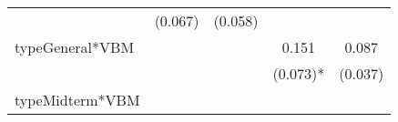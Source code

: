 \documentclass[12pt,twoside]{reedthesis}
\begin{document}
\begin{longtable}[]{@{}lcccc@{}}
\begin{minipage}[t]{0.14\columnwidth}
  \strut
  \end{minipage} & \begin{minipage}[t]{0.14\columnwidth}\centering\strut
  (0.067)\strut
  \end{minipage} & \begin{minipage}[t]{0.11\columnwidth}\centering\strut
  (0.058)\strut
  \end{minipage}\tabularnewline
  \begin{minipage}[t]{0.26\columnwidth}\raggedright\strut
  typeGeneral*VBM\strut
  \end{minipage} & \begin{minipage}[t]{0.12\columnwidth}\centering\strut
  \strut
  \end{minipage} & \begin{minipage}[t]{0.14\columnwidth}\centering\strut
  \strut
  \end{minipage} & \begin{minipage}[t]{0.14\columnwidth}\centering\strut
  0.151\strut
  \end{minipage} & \begin{minipage}[t]{0.11\columnwidth}\centering\strut
  0.087\strut
  \end{minipage}\tabularnewline
  \begin{minipage}[t]{0.26\columnwidth}\raggedright\strut
  \strut
  \end{minipage} & \begin{minipage}[t]{0.12\columnwidth}\centering\strut
  \strut
  \end{minipage} & \begin{minipage}[t]{0.14\columnwidth}\centering\strut
  \strut
  \end{minipage} & \begin{minipage}[t]{0.14\columnwidth}\centering\strut
  (0.073)*\strut
  \end{minipage} & \begin{minipage}[t]{0.11\columnwidth}\centering\strut
  (0.037)\strut
  \end{minipage}\tabularnewline
  \begin{minipage}[t]{0.26\columnwidth}\raggedright\strut
  typeMidterm*VBM\strut
  \end{minipage} & \begin{minipage}[t]{0.12\columnwidth}\centering\strut
  \strut
  \end{minipage} & \begin{minipage}[t]{0.14\columnwidth}\centering\strut
  \strut
  \end{minipage} & \begin{minipage}[t]{0.14\columnwidth}\centering\strut

\end{minipage}
\end{longtable}
\end{document}
